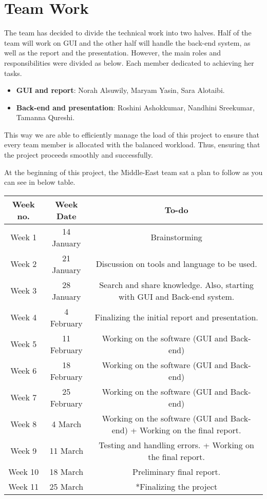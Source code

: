\documentclass{article}
\begin{document}
\section{Team Work}
The team has decided to divide the technical work into two halves. Half of the team will work on GUI and the other half will handle the back-end system, as well as the report and the presentation. However,  the main roles and responsibilities were divided as below. Each member dedicated to achieving her tasks.
\begin{itemize}

\item \textbf{GUI and report}: Norah Alsuwily, Maryam Yasin, Sara Alotaibi. 
\item \textbf{Back-end and presentation}: Roshini Ashokkumar, Nandhini Sreekumar, Tamanna Qureshi. 
\end{itemize}
This way we are able to efficiently manage the load of this project to ensure that every team member is allocated with the balanced workload. Thus, ensuring that the project proceeds smoothly and successfully.



At the beginning of this project, the Middle-East team sat a plan to follow as you can see in below table. 

\begin{center}
\begin{tabular}{ |c|c|c|} 
\hline
\textbf{Week no.} & \textbf{Week Date } & \textbf{To-do } \\ 
\hline
Week 1 & 14 January  & Brainstorming \\ 
\hline
Week 2 & 21 January  & Discussion  on tools and language to be used. \\ 
\hline

Week 3 & 28 January & Search and share knowledge. 
 Also, starting with GUI and Back-end system. 
 \\ 
\hline
Week 4 & 4 February & Finalizing the initial report and presentation.  \\ 
\hline
Week 5 &  11 February & Working on the software (GUI and Back-end)  \\
\hline
Week 6 & 18  February & Working on the software (GUI and Back-end)   \\ 
\hline
Week 7 & 25  February & Working on the software (GUI and Back-end)   \\ 
\hline
Week 8 & 4 March  & Working on the software (GUI and Back-end) + Working on the final report.   \\ 
\hline
Week 9 & 11 March  & Testing and handling errors. + Working on the final report.   \\ 
\hline
Week 10 & 18 March  & Preliminary final report. \\ 
\hline
Week 11 & 25 March  & *Finalizing the project  \\ 

\hline

\end{tabular}
\end{center}
\end{document}
